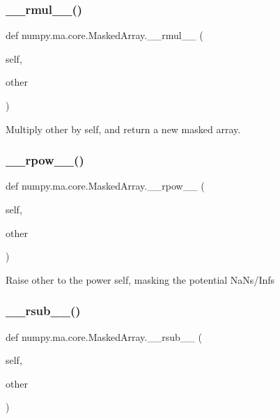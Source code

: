 \subsubsection{\texorpdfstring{\+\_\+\+\_\+rmul\+\_\+\+\_\+()}{\_\_rmul\_\_()}}
{\footnotesize\ttfamily def numpy.\+ma.\+core.\+Masked\+Array.\+\_\+\+\_\+rmul\+\_\+\+\_\+ (\begin{DoxyParamCaption}\item[{}]{self,  }\item[{}]{other }\end{DoxyParamCaption})}

\begin{DoxyVerb}Multiply other by self, and return a new masked array.\end{DoxyVerb}
 \mbox{\label{classnumpy_1_1ma_1_1core_1_1MaskedArray_a3ce6e43d0e3670386e6f0085d00dcaac}} 
\subsubsection{\texorpdfstring{\+\_\+\+\_\+rpow\+\_\+\+\_\+()}{\_\_rpow\_\_()}}
{\footnotesize\ttfamily def numpy.\+ma.\+core.\+Masked\+Array.\+\_\+\+\_\+rpow\+\_\+\+\_\+ (\begin{DoxyParamCaption}\item[{}]{self,  }\item[{}]{other }\end{DoxyParamCaption})}

\begin{DoxyVerb}Raise other to the power self, masking the potential NaNs/Infs\end{DoxyVerb}
 \mbox{\label{classnumpy_1_1ma_1_1core_1_1MaskedArray_a7e8bd70a0762d8ae404577fa39262c8a}} 
\subsubsection{\texorpdfstring{\+\_\+\+\_\+rsub\+\_\+\+\_\+()}{\_\_rsub\_\_()}}
{\footnotesize\ttfamily def numpy.\+ma.\+core.\+Masked\+Array.\+\_\+\+\_\+rsub\+\_\+\+\_\+ (\begin{DoxyParamCaption}\item[{}]{self,  }\item[{}]{other }\end{DoxyParamCaption})}

